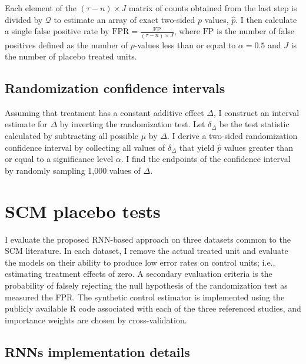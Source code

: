 \documentclass[hidelinks,12pt]{article}
\begin{document}
Each element of the $(\tau-n) \times J$ matrix of counts obtained from the last step is divided by $\mathcal{Q}$ to estimate an array of exact two-sided $p$ values, $\hat{p}$. I then calculate a single false positive rate by $\text{FPR} = \frac{\text{FP}}{(\tau-n) \times J}$, where $\text{FP}$ is the number of false positives defined as the number of $p$-values less than or equal to $\alpha=0.5$ and $J$ is the number of placebo treated units.

\subsection{Randomization confidence intervals}

Assuming that treatment has a constant additive effect $\Delta$, I construct an interval estimate for $\Delta$ by inverting the randomization test. Let $\delta_\Delta$ be the test statistic calculated by subtracting all possible $\mu$ by $\Delta$. I derive a two-sided randomization confidence interval by collecting all values of $\delta_\Delta$ that yield $\hat{p}$ values greater than or equal to a significance level $\alpha$. I find the endpoints of the confidence interval by randomly sampling 1,000 values of $\Delta$.

\section{SCM placebo tests} \label{placebo}

I evaluate the proposed RNN-based approach on three datasets common to the SCM literature. In each dataset, I remove the actual treated unit and evaluate the models on their ability to produce low error rates on control units; i.e., estimating treatment effects of zero. A secondary evaluation criteria is the probability of falsely rejecting the null hypothesis of the randomization test as measured the FPR. The synthetic control estimator is implemented using the publicly available \textsf{R} code associated with each of the three referenced studies, and importance weights are chosen by cross-validation. 

\subsection{RNNs implementation details}
\end{document}
